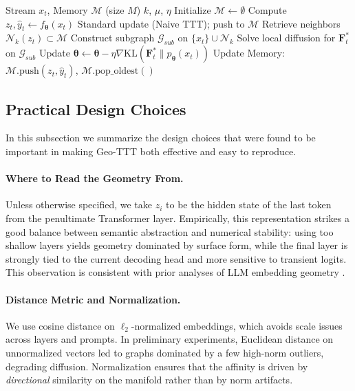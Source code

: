 \documentclass{article}
\theoremstyle{plain}
\theoremstyle{definition}
\theoremstyle{remark}
\newcommand{\G}{\mathcal{G}}       %
\newcommand{\F}{\mathbf{F}}        %
\newcommand{\ThetaParam}{\boldsymbol{\theta}}
\begin{document}
\begin{algorithm}[tb]
   \caption{Streaming Geo-TTT (Real-Time)}
   \label{alg:streaming}
\begin{algorithmic}[1]
    Stream $x_t$, Memory $\mathcal{M}$ (size $M$)
    $k$, $\mu$, $\eta$
   \STATE Initialize $\mathcal{M} \leftarrow \emptyset$
       \STATE Compute $z_t, \hat{y}_t \leftarrow f_{\ThetaParam}(x_t)$
           \STATE Standard update (Naive TTT); push to $\mathcal{M}$
       \ELSE
           \STATE Retrieve neighbors $\mathcal{N}_k(z_t) \subset \mathcal{M}$
           \STATE Construct subgraph $\G_{sub}$ on $\{x_t\} \cup \mathcal{N}_k$
           \STATE Solve local diffusion for $\F^*_t$ on $\G_{sub}$
           \STATE Update $\ThetaParam \leftarrow \ThetaParam - \eta \nabla \text{KL}(\F^*_t \| p_{\ThetaParam}(x_t))$
           \STATE Update Memory: $\mathcal{M}.\text{push}(z_t, \hat{y}_t)$, $\mathcal{M}.\text{pop\_oldest}()$
       \ENDIF
   \ENDFOR
\end{algorithmic}
\end{algorithm}

\subsection{Practical Design Choices}
\label{sec:practical}

In this subsection we summarize the design choices that were found to be important in making Geo-TTT both effective and easy to reproduce.

\paragraph{Where to Read the Geometry From.}
Unless otherwise specified, we take $z_i$ to be the hidden state of the last token from the penultimate Transformer layer. Empirically, this representation strikes a good balance between semantic abstraction and numerical stability: using too shallow layers yields geometry dominated by surface form, while the final layer is strongly tied to the current decoding head and more sensitive to transient logits. This observation is consistent with prior analyses of LLM embedding geometry \cite{mamou2020emergence, reiss2023geometric}.

\paragraph{Distance Metric and Normalization.}
We use cosine distance on $\ell_2$-normalized embeddings, which avoids scale issues across layers and prompts. In preliminary experiments, Euclidean distance on unnormalized vectors led to graphs dominated by a few high-norm outliers, degrading diffusion. Normalization ensures that the affinity is driven by \emph{directional} similarity on the manifold rather than by norm artifacts.
\end{document}
